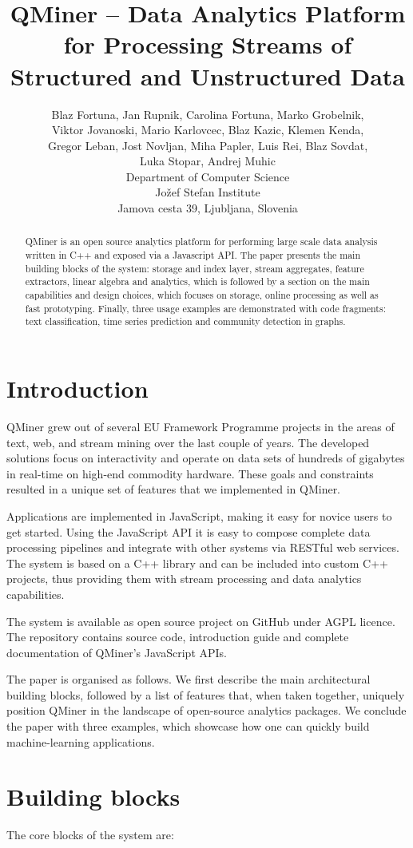 \documentclass{article} %
\title{QMiner – Data Analytics Platform for Processing Streams of Structured and Unstructured Data}
\author{
Blaz Fortuna, Jan Rupnik, Carolina Fortuna, Marko Grobelnik, \\
Viktor Jovanoski, Mario Karlovcec, Blaz Kazic, Klemen Kenda, \\
Gregor Leban, Jost Novljan, Miha Papler, Luis Rei, Blaz Sovdat, \\
Luka Stopar, Andrej Muhic \\
Department of Computer Science\\
Jožef Stefan Institute\\
Jamova cesta 39, Ljubljana, Slovenia \\
}
\begin{document}
\maketitle

\begin{abstract}
QMiner is an open source analytics platform for performing large scale data analysis written in C++ and exposed via a Javascript API.
The paper presents the main building blocks of the system: storage and index layer, stream aggregates,
feature extractors, linear algebra and analytics, which is followed by a section on the main capabilities and design choices, which
focuses on storage, online processing as well as fast prototyping. Finally, three usage examples are demonstrated with code
fragments: text classification, time series prediction and community detection in graphs.\end{abstract}

\section{Introduction}
QMiner grew out of several EU Framework Programme projects in the areas of text, web, and stream mining over the last couple of years. The developed solutions focus on interactivity and operate on data sets of hundreds of gigabytes in real-time on high-end commodity hardware. These goals and constraints resulted in a unique set of features that we implemented in QMiner.

Applications are implemented in JavaScript, making it easy for novice users to get started. Using the JavaScript API it is easy to compose complete data processing pipelines and integrate with other systems via RESTful web services. The system is based on a C++ library and can be included into custom C++ projects, thus providing them with stream processing and data analytics capabilities.

The system is available as open source project on GitHub under AGPL licence. The repository contains source code, introduction guide and complete documentation of QMiner's JavaScript APIs.

The paper is organised as follows. We first describe the main architectural building blocks, followed by a list of features that, when taken together, uniquely position QMiner in the landscape of open-source analytics packages. We conclude the paper with three examples, which showcase how one can quickly build machine-learning applications.

\section{Building blocks}
The core blocks of the system are:
\end{document}
